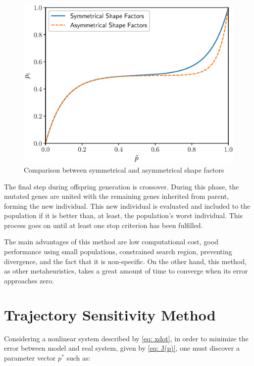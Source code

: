 \begin{figure}[h]
	\caption{Comparison between symmetrical and asymmetrical shape factors}
	\begin{center}
		\includegraphics[scale=.7]{Images/symmetrical_transf.eps}
	\end{center}
	\label{fig: diffs}
\end{figure}

The final step during offspring generation is crossover. During this phase, the mutated genes are united with the remaining genes inherited from parent, forming the new individual. This new individual is evaluated and included to the population if it is better than, at least, the population's worst individual. This process goes on until at least one stop criterion has been fulfilled.

The main advantages of this method are low computational cost, good performance using small populations, constrained search region, preventing divergence, and the fact that it is non-specific. On the other hand, this method, as other metaheuristics, takes a great amount of time to converge when its error approaches zero.

\section{Trajectory Sensitivity Method}

Considering a nonlinear system described by \eqref{eq: xdot}, in order to minimize the error between model and real system, given by \eqref{eq: J(p)}, one must discover a parameter vector $p^{*}$ such as:

